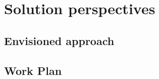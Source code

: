 \chapter{Solution perspectives}\label{chap:chap4}

\section{Envisioned approach}

\section{Work Plan}